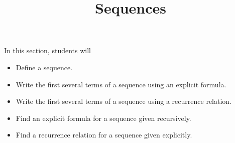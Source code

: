 \documentclass{ximera}
\title{Sequences}
\begin{document}
\begin{abstract}
\end{abstract}

\maketitle
















\begin{sectionOutcomes}

In this section, students will

\begin{itemize}
\item Define a sequence.
\item Write the first several terms of a sequence using an explicit formula.
\item Write the first several terms of a sequence using a recurrence
  relation.
\item Find an explicit formula for a sequence given recursively.
\item Find a recurrence relation for a sequence given explicitly.
\end{itemize}

\end{sectionOutcomes}
\end{document}
